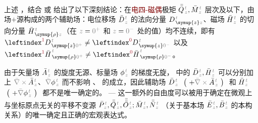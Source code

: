 上述 ，结合  或  给出了以下深刻结论：在\textcolor{Maroon}{电四-磁偶}极矩 $\bar{\bar{Q}}^{\;\!\mathcolor{gray}{t}}_{\;\!\mathcolor{gray}{z}}, \bar{M}^{\;\!\mathcolor{gray}{t}}_{\;\!\mathcolor{gray}{z}}$ 层次及以下，由场$+$源构成的两个辅助场：电位移场 $\bar{D}^{\;\!\mathcolor{gray}{t}}_{\;\!\mathcolor{gray}{z}}$ 的法向分量 $D^{\;\!\mathcolor{gray}{t}}_{\;\! \symup{z} \mathcolor{gray}{z}}$、磁场 $\bar{H}^{\;\!\mathcolor{gray}{t}}_{\;\!\mathcolor{gray}{z}}$ 的切向分量 $\bar{H}^{\;\!\mathcolor{gray}{t}}_{\;\! \symup{\rho} \mathcolor{gray}{z}}$（在 $\mathcolor{gray}{z \mathcolor{black}{=} 0^+}$ 和 $\mathcolor{gray}{z \mathcolor{black}{=} 0^-}$ 处的值）均不连续，即有 $\leftindex^{\textcolor{Maroon}{1}} D^{\;\!\mathcolor{gray}{t}}_{\;\! \symup{z} \mathcolor{gray}{0^+}} \neq \leftindex^{\textcolor{Maroon}{0}} D^{\;\!\mathcolor{gray}{t}}_{\;\! \symup{z} \mathcolor{gray}{0^-}}$ 以及 $\leftindex^{\textcolor{Maroon}{1}} {\bar{H}}^{\;\!\mathcolor{gray}{t}}_{\;\! \symup{\rho} \mathcolor{gray}{0^+}} \neq \leftindex^{\textcolor{Maroon}{0}} {\bar{H}}^{\;\!\mathcolor{gray}{t}}_{\;\! \symup{\rho} \mathcolor{gray}{0^-}}$。

由于矢量场 $\bar{A}^{\;\!\mathcolor{gray}{t}}_{\;\!\mathcolor{gray}{z}}$ 的旋度无源、标量场 $\phi^{\;\!\mathcolor{gray}{t}}_{\;\!\mathcolor{gray}{z}}$ 的梯度无旋， 中的 $\bar{D}^{\;\!\mathcolor{gray}{t}}_{\;\!\mathcolor{gray}{z}}, \bar{H}^{\;\!\mathcolor{gray}{t}}_{\;\!\mathcolor{gray}{z}}$ 可以分别加上 $\mathcolor{gray}{\bar{\nabla} \times} \bar{A}^{\;\!\mathcolor{gray}{t}}_{\;\!\mathcolor{gray}{z}}$、$\mathcolor{gray}{\bar{\nabla}} \phi^{\;\!\mathcolor{gray}{t}}_{\;\!\mathcolor{gray}{z}}$ 而不影响 、 的成立，因此辅助场 $\bar{D}^{\;\!\mathcolor{gray}{t}}_{\;\!\mathcolor{gray}{z}}$ $~\left(~ + \mathcolor{gray}{\bar{\nabla} \times} \bar{A}^{\;\!\mathcolor{gray}{t}}_{\;\!\mathcolor{gray}{z}} ~\right)~$ 和 $\bar{H}^{\;\!\mathcolor{gray}{t}}_{\;\!\mathcolor{gray}{z}}$ $~\left(~ + \mathcolor{gray}{\bar{\nabla}} \phi^{\;\!\mathcolor{gray}{t}}_{\;\!\mathcolor{gray}{z}} ~\right)~$ 都不是唯一确定的。 ---  这一额外的自由度可以被用于确定在微观上与坐标原点无关的平移不变源 $\bar{P}^{\;\!\mathcolor{gray}{t}}_{\;\!\mathcolor{gray}{z}},\bar{\bar{Q}}^{\;\!\mathcolor{gray}{t}}_{\;\!\mathcolor{gray}{z}},\bar{\bar{\bar{O}}}^{\;\!\mathcolor{gray}{t}}_{\;\!\mathcolor{gray}{z}} ; \bar{M}^{\;\!\mathcolor{gray}{t}}_{\;\!\mathcolor{gray}{z}}, \bar{\bar{N}}^{\;\!\mathcolor{gray}{t}}_{\;\!\mathcolor{gray}{z}}$ （关于基本场 $\bar{E}^{\;\!\mathcolor{gray}{t}}_{\;\!\mathcolor{gray}{z}}, \bar{B}^{\;\!\mathcolor{gray}{t}}_{\;\!\mathcolor{gray}{z}}$ 的本构关系）的唯一确定且正确的宏观表达式\cite{welterTranslationallyInvariantSemiclassical2013,delangeTranslationalInvariancePost2012,langeTransitionMicroscopicMacroscopic2012,langeMultipoleTheoryHehl2015,raabCommentOriginDependence2010a,OriginindependentCalculationQuadrupole}。

